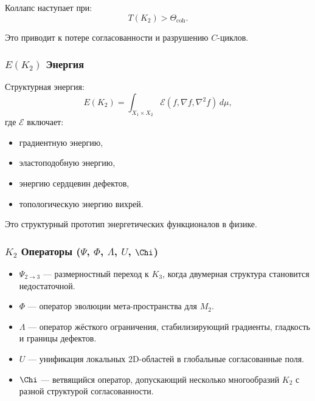 Коллапс наступает при:
\[
T(K_2) > \Theta_{\mathrm{coh}}.
\]

Это приводит к потере согласованности и разрушению $C$-циклов.

\subsubsection{\texorpdfstring{$E(K_2)$}{E(K_2)} Энергия}

Структурная энергия:
\[
E(K_2) = \int_{X_1 \times X_2}
\mathcal{E}(f, \nabla f, \nabla^2 f)\, d\mu,
\]
где $\mathcal{E}$ включает:
\begin{itemize}
    \item градиентную энергию,
    \item эластоподобную энергию,
    \item энергию сердцевин дефектов,
    \item топологическую энергию вихрей.
\end{itemize}

Это структурный прототип энергетических функционалов в физике.

\subsubsection{\texorpdfstring{$K_2$}{K_2} Операторы (\texorpdfstring{$\Psi$}{\Psi}, \texorpdfstring{$\Phi$}{\Phi}, \texorpdfstring{$\Lambda$}{\Lambda}, \texorpdfstring{$U$}{U}, \texorpdfstring{$\Chi$}{\Chi})}

\begin{itemize}
    \item $\Psi_{2\to3}$ — размерностный переход к $K_3$, когда
          двумерная структура становится недостаточной.
    \item $\Phi$ — оператор эволюции мета-пространства для $M_2$.
    \item $\Lambda$ — оператор жёсткого ограничения, стабилизирующий
          градиенты, гладкость и границы дефектов.
    \item $U$ — унификация локальных 2D-областей в глобальные согласованные
          поля.
    \item $\Chi$ — ветвящийся оператор, допускающий несколько многообразий
          $K_2$ с разной структурой согласованности.
\end{itemize}

